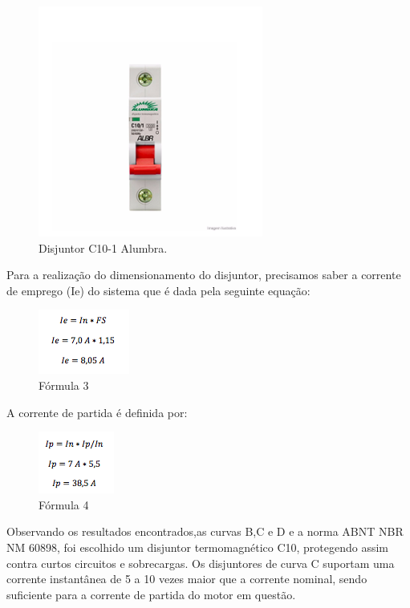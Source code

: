 \begin{figure}[!h]
	\centering
		\includegraphics[scale=0.5]{figuras/energia/5.png}
	\caption{Disjuntor C10-1 Alumbra.}
\end{figure}

Para a realização do dimensionamento do disjuntor, precisamos saber a corrente de emprego (Ie) do sistema que é dada pela seguinte equação:

\begin{figure}[!h]
	\centering
		\includegraphics[scale=0.9]{figuras/energia/6.png}
	\caption{Fórmula 3}
\end{figure}

A corrente de partida é definida por:

\begin{figure}[!h]
	\centering
		\includegraphics[scale=0.9]{figuras/energia/7.png}
	\caption{Fórmula 4}
\end{figure}

Observando os resultados encontrados,as curvas B,C e D e a norma ABNT NBR NM 60898, foi escolhido um disjuntor termomagnético C10, protegendo assim contra curtos circuitos e sobrecargas. Os disjuntores de curva C suportam uma corrente instantânea de 5 a 10 vezes maior que a corrente nominal, sendo suficiente para a corrente de partida do motor em questão. 

